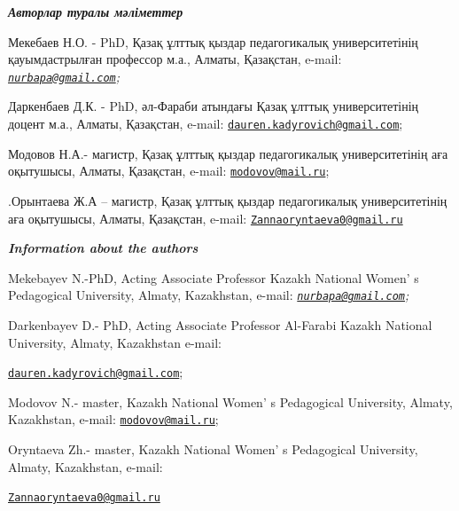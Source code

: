 \begin{authorinfo}
\emph{{\bfseries Авторлар туралы мәліметтер}}

Мекебаев Н.О. - PhD, Қазақ ұлттық қыздар педагогикалық университетінің
қауымдастрылған профессор м.а., Алматы, Қазақстан, e-mail:
\emph{\href{mailto:nurbapa@gmail.com}{\nolinkurl{nurbapa@gmail.com}};}

Даркенбаев Д.К. - PhD, әл-Фараби атындағы Қазақ ұлттық
университетінің доцент м.а., Алматы, Қазақстан, e-mail:
\href{mailto:dauren.kadyrovich@gmail.com}{\nolinkurl{dauren.kadyrovich@gmail.com}};

Модовов Н.А.- магистр, Қазақ ұлттық қыздар педагогикалық
университетінің аға оқытушысы, Алматы, Қазақстан, e-mail:
\href{mailto:modovov@mail.ru}{\nolinkurl{modovov@mail.ru}};

.Орынтаева Ж.А -- магистр, Қазақ ұлттық қыздар педагогикалық
университетінің аға оқытушысы, Алматы, Қазақстан, e-mail:
\href{mailto:Zannaoryntaeva0@gmail.ru}{\nolinkurl{Zannaoryntaeva0@gmail.ru}}

\emph{{\bfseries Information about the authors}}

Mekebayev N.-PhD, Acting Associate Professor Kazakh National
Women' s Pedagogical University, Almaty, Kazakhstan,
e-mail:
\emph{\href{mailto:nurbapa@gmail.com}{\nolinkurl{nurbapa@gmail.com}};}

Darkenbayev D.- PhD, Acting Associate Professor Al-Farabi Kazakh
National University, Almaty, Kazakhstan e-mail:

\href{mailto:dauren.kadyrovich@gmail.com}{\nolinkurl{dauren.kadyrovich@gmail.com}};

Modovov N.- master, Kazakh National Women' s Pedagogical
University, Almaty, Kazakhstan, e-mail:
\href{mailto:modovov@mail.ru}{\nolinkurl{modovov@mail.ru}};

Oryntaeva Zh.- master, Kazakh National Women' s
Pedagogical University, Almaty, Kazakhstan, e-mail:

\href{mailto:Zannaoryntaeva0@gmail.ru}{\nolinkurl{Zannaoryntaeva0@gmail.ru}}
\end{authorinfo}
